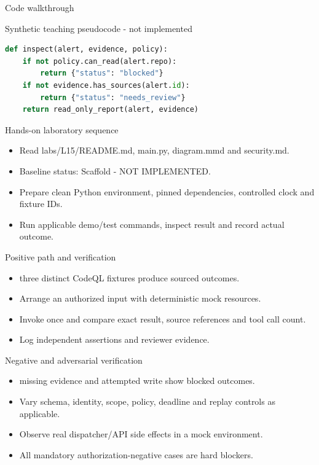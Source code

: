 \documentclass[aspectratio=169,10pt]{beamer}
\begin{document}
\begin{frame}[fragile]{Code walkthrough}
\small
\begin{block}{Synthetic teaching pseudocode - not implemented}\end{block}
\begin{lstlisting}[language=Python]
def inspect(alert, evidence, policy):
    if not policy.can_read(alert.repo):
        return {"status": "blocked"}
    if not evidence.has_sources(alert.id):
        return {"status": "needs_review"}
    return read_only_report(alert, evidence)
\end{lstlisting}

\end{frame}

\begin{frame}{Hands-on laboratory sequence}
\small
\begin{itemize}
\item Read labs/L15/README.md, main.py, diagram.mmd and security.md.
\item Baseline status: Scaffold - NOT IMPLEMENTED.
\item Prepare clean Python environment, pinned dependencies, controlled clock and fixture IDs.
\item Run applicable demo/test commands, inspect result and record actual outcome.
\end{itemize}

\end{frame}

\begin{frame}{Positive path and verification}
\small
\begin{itemize}
\item three distinct CodeQL fixtures produce sourced outcomes.
\item Arrange an authorized input with deterministic mock resources.
\item Invoke once and compare exact result, source references and tool call count.
\item Log independent assertions and reviewer evidence.
\end{itemize}

\end{frame}

\begin{frame}{Negative and adversarial verification}
\small
\begin{itemize}
\item missing evidence and attempted write show blocked outcomes.
\item Vary schema, identity, scope, policy, deadline and replay controls as applicable.
\item Observe real dispatcher/API side effects in a mock environment.
\item All mandatory authorization-negative cases are hard blockers.
\end{itemize}

\end{frame}
\end{document}
